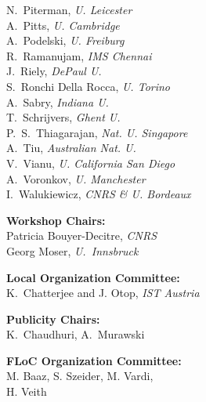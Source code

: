 \documentclass[oneside]{article}
\begin{document}
{\begin{minipage}[t]{\leftcol}
  N.\ Piterman, \emph{U. Leicester} \\
  A.\ Pitts, \emph{U. Cambridge} \\
  A.\ Podelski, \emph{U. Freiburg} \\
  R.\ Ramanujam, \emph{IMS Chennai} \\
  J.\ Riely, \emph{DePaul U.} \\
  S.\ Ronchi Della Rocca, \emph{U. Torino} \\
  A.\ Sabry, \emph{Indiana U.} \\
  T.\ Schrijvers, \emph{Ghent U.} \\
  P.\ S.\ Thiagarajan, \emph{Nat. U. Singapore} \\
  A.\ Tiu, \emph{Australian Nat. U.} \\
  V.\ Vianu, \emph{U. California San Diego} \\
  A.\ Voronkov, \emph{U. Manchester} \\
  I.\ Walukiewicz, \emph{CNRS \& U. Bordeaux}

  \vspace{.5em}

  \textbf{Workshop Chairs:} \\[.4ex]
  Patricia Bouyer-Decitre, \emph{CNRS} \\
  Georg Moser, \emph{U.\ Innsbruck}

  \vspace{.5em}

  \textbf{Local Organization Committee:}\\[.4ex]
  K.\ Chatterjee and J. Otop, \emph{IST Austria}

  \vspace{.5em}

  \textbf{Publicity Chairs:}\\[.4ex]
  K.\ Chaudhuri, %
  A.\ Murawski%

  \vspace{.5em}

  \textbf{FLoC Organization Committee:} \\[.4ex]
  M. Baaz, S. Szeider, M. Vardi,\\ H. Veith



\end{minipage}}
\end{document}
